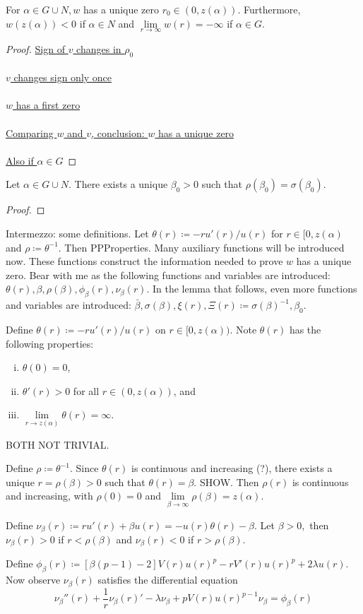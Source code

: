 \begin{lemma}\label{wq}For $\alpha\in G\cup N,w$ has a unique zero $r_0\in(0,z(\alpha)).$ Furthermore, $w(z(\alpha))<0$ if $\alpha\in N$ and $\underset{r\to\infty}{\lim}w(r)=-\infty$ if $\alpha\in G$.
\begin{proof} 
\underline{Sign of $v$ changes in $\rho_0$} \\ \\ \underline{$v$ changes sign only once} \\ \\  \underline{$w$ has a first zero} \\ \\ \underline{Comparing $w$ and $v$, conclusion: $w$ has a unique zero} \\ \\ \underline{Also if $\alpha\in G$}
\end{proof} 
\end{lemma}

\begin{lemma}Let $\alpha\in G\cup N$. There exists a unique $\beta_0>0$ such that $\rho(\beta_0)=\sigma(\beta_0)$.
\begin{proof} \end{proof}
\end{lemma}

{\color{gray} Intermezzo: some definitions. Let $\theta(r)\coloneqq-ru'(r)/u(r)$ for $r\in[0,z(\alpha)$ and $\rho\coloneqq\theta^{-1}$. Then PPProperties. Many auxiliary functions will be introduced now. These functions construct the information needed to prove $w$ has a unique zero. Bear with me as the following functions and variables are introduced: $\theta(r),\beta,\rho(\beta),\phi_{\beta}(r),\nu_{\beta}(r)$. In the lemma that follows, even more functions and variables are introduced: $\bar\beta,\sigma(\beta),\xi(r), \Xi(r)\coloneqq\sigma(\beta)^{-1},\beta_0$.}

{\color{teal}Define $\theta(r)\coloneqq-ru'(r)/u(r)$ on $r\in[0,z(\alpha))$. Note $\theta(r)$ has the following properties: \begin{enumerate}[(i)]\item $\theta(0)=0$, \item $\theta'(r)>0$ for all $r\in(0,z(\alpha))$, and \item $\underset{r\to z(\alpha)}{\lim}\theta(r)=\infty$. \end{enumerate} BOTH NOT TRIVIAL.

Define $\rho\coloneqq\theta^{-1}$. Since $\theta(r)$ is continuous and increasing (?), there exists a unique $r=\rho(\beta)>0$ such that $\theta(r)=\beta$. SHOW. Then $\rho(r)$ is continuous and increasing, with $\rho(0)=0$ and $\underset{\beta\to\infty}{\lim}\rho(\beta)=z(\alpha).$

Define $\nu_{\beta}(r)\coloneqq ru'(r)+\beta u(r)=-u(r){\theta(r)-\beta}.$ Let $\beta>0,$ then $\nu_{\beta}(r)>0$ if $r<\rho(\beta)$ and $\nu_{\beta}(r)<0$ if $r>\rho(\beta)$.

Define $\phi_{\beta}(r)\coloneqq\left[\beta(p-1)-2\right]V(r)u(r)^p-rV'(r)u(r)^p+2\lambda u(r).$ Now observe $\nu_{\beta}(r)$ satisfies the differential equation $$\nu_{\beta}''(r)+\frac{1}{r}\nu_{\beta}(r)'-\lambda\nu_{\beta}+pV(r)u(r)^{p-1}\nu_{\beta}=\phi_{\beta}(r)$$}

